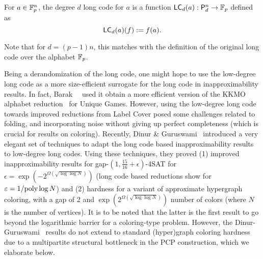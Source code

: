 \begin{definition}

For $a \in \mathbb F_p^n$, the degree $d$ long code for $a$ is a function $\textsf{LC}_d(a):\mathsf P^n_{d} \rightarrow \mathbb F_p$ defined as
$$\textsf{LC}_d(a)(f) := f(a).$$
\end{definition}
\noindent Note that for $d=(p-1)n$, this matches with the definition of the
original long code over the alphabet $\mathbb F_p$. 

Being a derandomization of the long code, one might hope to use the low-degree long code as a more size-efficient surrogate for the long code in inapproximability results. In fact, Barak~\etal~\cite{BarakGHMRS2012} used
it obtain a more efficient version of the KKMO alphabet
reduction~\cite{KhotKMO2007} for Unique Games. However, using the low-degree long code towards improved reductions from Label Cover posed some challenges related to folding, and incorporating noise without giving up perfect completeness (which is crucial for results on coloring). Recently, Dinur \& Guruswami~\cite{DinurG2013}
introduced a very elegant set of techniques to adapt the long code
based inapproximability results to low-degree long codes. Using these
techniques, they proved (1) improved inapproximability results for
gap-$(1,\frac{15}{16}+\epsilon)$-4SAT for $\epsilon =
\exp(-2^{\Omega(\sqrt{\log \log N})})$ (long code based reductions
show for $\varepsilon = 1/\textnormal{poly}\log N$) and (2) hardness for a variant of
approximate hypergraph coloring, with a gap of 2 and
$\exp(2^{\Omega(\sqrt{\log\log N})})$ number of colors (where $N$ is
the number of vertices). It is to be noted that the latter is the
first result to go beyond the logarithmic barrier for a coloring-type
problem. However, the Dinur-Guruswami~\cite{DinurG2013} results do not
extend to standard (hyper)graph coloring hardness due to a
multipartite structural bottleneck in the PCP construction, which we
elaborate below.

